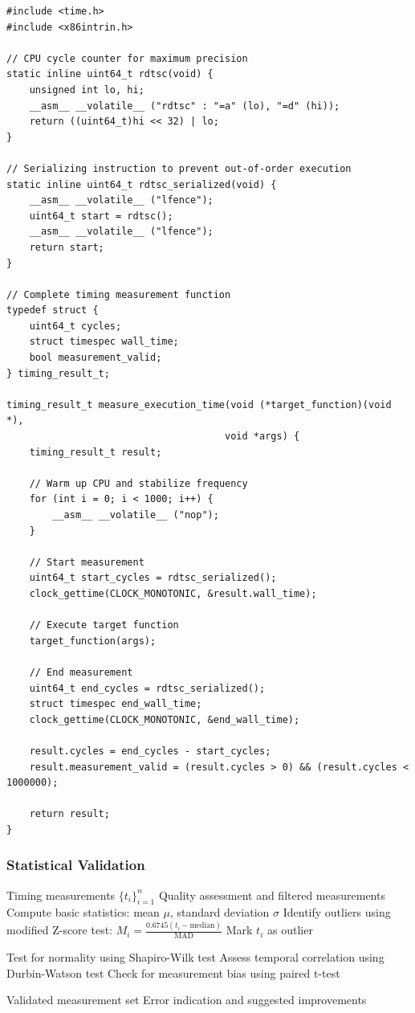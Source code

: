 \documentclass[11pt,a4paper]{article}
\theoremstyle{definition}
\begin{document}
\begin{lstlisting}[caption={High-Resolution Timing Measurement}]
#include <time.h>
#include <x86intrin.h>

// CPU cycle counter for maximum precision
static inline uint64_t rdtsc(void) {
    unsigned int lo, hi;
    __asm__ __volatile__ ("rdtsc" : "=a" (lo), "=d" (hi));
    return ((uint64_t)hi << 32) | lo;
}

// Serializing instruction to prevent out-of-order execution
static inline uint64_t rdtsc_serialized(void) {
    __asm__ __volatile__ ("lfence");
    uint64_t start = rdtsc();
    __asm__ __volatile__ ("lfence");
    return start;
}

// Complete timing measurement function
typedef struct {
    uint64_t cycles;
    struct timespec wall_time;
    bool measurement_valid;
} timing_result_t;

timing_result_t measure_execution_time(void (*target_function)(void *), 
                                      void *args) {
    timing_result_t result;
    
    // Warm up CPU and stabilize frequency
    for (int i = 0; i < 1000; i++) {
        __asm__ __volatile__ ("nop");
    }
    
    // Start measurement
    uint64_t start_cycles = rdtsc_serialized();
    clock_gettime(CLOCK_MONOTONIC, &result.wall_time);
    
    // Execute target function
    target_function(args);
    
    // End measurement  
    uint64_t end_cycles = rdtsc_serialized();
    struct timespec end_wall_time;
    clock_gettime(CLOCK_MONOTONIC, &end_wall_time);
    
    result.cycles = end_cycles - start_cycles;
    result.measurement_valid = (result.cycles > 0) && (result.cycles < 1000000);
    
    return result;
}
\end{lstlisting}

\subsubsection{Statistical Validation}

\begin{algorithm}
\caption{Measurement Quality Assessment}
\begin{algorithmic}[1]
\REQUIRE Timing measurements $\{t_i\}_{i=1}^n$
\ENSURE Quality assessment and filtered measurements
\STATE Compute basic statistics: mean $\mu$, standard deviation $\sigma$
\STATE Identify outliers using modified Z-score test:
    \STATE $M_i = \frac{0.6745(t_i - \text{median})}{\text{MAD}}$
        \STATE Mark $t_i$ as outlier
    \ENDIF
\ENDFOR

\STATE Test for normality using Shapiro-Wilk test
\STATE Assess temporal correlation using Durbin-Watson test
\STATE Check for measurement bias using paired t-test

    \RETURN Validated measurement set
\ELSE
    \RETURN Error indication and suggested improvements
\ENDIF
\end{algorithmic}
\end{algorithm}
\end{document}
